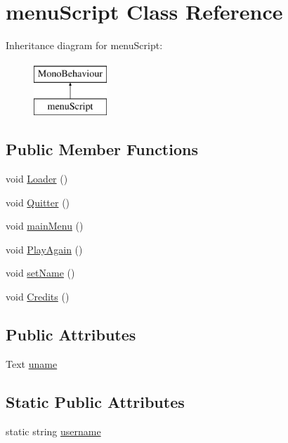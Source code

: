 \hypertarget{classmenu_script}{}\section{menu\+Script Class Reference}
\label{classmenu_script}
Inheritance diagram for menu\+Script\+:\begin{figure}[H]
\begin{center}
\leavevmode
\includegraphics[height=2.000000cm]{classmenu_script}
\end{center}
\end{figure}
\subsection*{Public Member Functions}
\begin{DoxyCompactItemize}
\item 
void \hyperlink{classmenu_script_ad8b1a2b775439cde293c20cf42c383bf}{Loader} ()
\item 
void \hyperlink{classmenu_script_a741eca3b4ba3e4e9dd70a6d871c0fff3}{Quitter} ()
\item 
void \hyperlink{classmenu_script_a138adad9002137957134de29d5240596}{main\+Menu} ()
\item 
void \hyperlink{classmenu_script_ade6543cb8aaebe9014418bfe89197f18}{Play\+Again} ()
\item 
void \hyperlink{classmenu_script_ab608551ab10281b8f248bc017a3a559b}{set\+Name} ()
\item 
void \hyperlink{classmenu_script_a81ffc41005f93c4dc0382fc94468e385}{Credits} ()
\end{DoxyCompactItemize}
\subsection*{Public Attributes}
\begin{DoxyCompactItemize}
\item 
Text \hyperlink{classmenu_script_a2e1aa02723579f3d35f956147bdb518d}{uname}
\end{DoxyCompactItemize}
\subsection*{Static Public Attributes}
\begin{DoxyCompactItemize}
\item 
static string \hyperlink{classmenu_script_ac884cc3a06860162c4fc9b4672753bc9}{username}
\end{DoxyCompactItemize}


